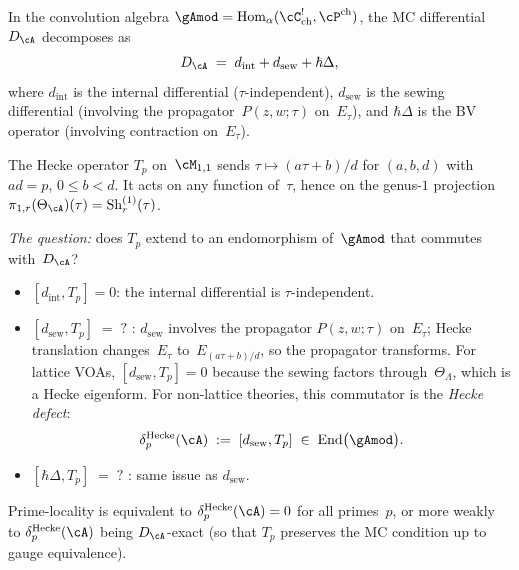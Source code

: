 \begin{remark}%
\label{rem:prime-locality-obstruction}%
%
%
In the convolution algebra
$\gAmod = \mathrm{Hom}_\alpha(\cC^!_{\mathrm{ch}},
\cP^{\mathrm{ch}})$, the MC differential $D_\cA$ decomposes as
\[
 D_\cA
 \;=\;
 d_{\mathrm{int}} + d_{\mathrm{sew}} + \hbar\Delta,
\]
where $d_{\mathrm{int}}$ is the internal differential
($\tau$-independent), $d_{\mathrm{sew}}$ is the sewing
differential (involving the propagator~$P(z,w;\tau)$
on~$E_\tau$), and $\hbar\Delta$ is the BV operator (involving
contraction on~$E_\tau$).

The Hecke operator $T_p$ on~$\cM_{1,1}$ sends
$\tau \mapsto (a\tau{+}b)/d$ for $(a,b,d)$ with $ad = p$,
$0 \le b < d$. It acts on any function of~$\tau$, hence on
the genus-$1$ projection $\pi_{1,r}(\Theta_\cA)(\tau) =
\operatorname{Sh}_r^{(1)}(\tau)$.

\emph{The question:} does $T_p$ extend to an endomorphism
of~$\gAmod$ that commutes with~$D_\cA$?

\begin{itemize}[nosep]
\item $[d_{\mathrm{int}}, T_p] = 0$: the internal differential
 is $\tau$-independent. \checkmark
\item $[d_{\mathrm{sew}}, T_p] \;=\; ?$ \;:
 $d_{\mathrm{sew}}$ involves the propagator
 $P(z,w;\tau)$ on~$E_\tau$; Hecke translation changes~$E_\tau$
 to~$E_{(a\tau+b)/d}$, so the propagator transforms.
 For lattice VOAs, $[d_{\mathrm{sew}}, T_p] = 0$ because the
 sewing factors through~$\Theta_\Lambda$, which is a Hecke
 eigenform. For non-lattice theories, this commutator is
 the \emph{Hecke defect}:
 \[
 \delta_p^{\mathrm{Hecke}}(\cA)
 \;:=\;
 [d_{\mathrm{sew}}, T_p]
 \;\in\;
 \mathrm{End}\bigl(\gAmod\bigr).
 \]
\item $[\hbar\Delta, T_p] \;=\; ?$ \;:
 same issue as $d_{\mathrm{sew}}$.
\end{itemize}
Prime-locality is equivalent to
$\delta_p^{\mathrm{Hecke}}(\cA) = 0$ for all primes~$p$,
or more weakly to
$\delta_p^{\mathrm{Hecke}}(\cA)$ being
$D_\cA$-exact (so that $T_p$ preserves the MC condition
up to gauge equivalence).
\end{remark}

